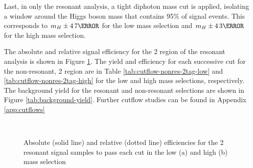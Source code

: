 Last, in only the resonant analysis, a tight diphoton mass cut is applied, isolating a window around the Higgs boson mass that contains 95\% of signal events. This corresponds to $m_H \pm \unit{4.7}{\GeV}$ for the low mass selection and $m_H \pm \unit{4.3}{\GeV}$ for the high mass selection.

The absolute and relative signal efficiency for the 2 \btag region of the resonant analysis is shown in Figure \ref{fig:resonant-cutflow}. The yield and efficiency for each successive cut for the non-resonant, 2 \btag region are in Table \ref{tab:cutflow-nonres-2tag-low} and \ref{tab:cutflow-nonres-2tag-high} for the low and high mass selections, respectively. The background yield for the resonant and non-resonant selections are shown in Figure \ref{tab:background-yield}. Further cutflow studies can be found in Appendix \ref{app:cutflows}

\begin{figure}[!h]
  \centering
  \\
  \caption[Absolute and relative efficiencies for the 2 \btag category, high mass selection]{Absolute (solid line) and relative (dotted line) efficiencies for the 2 \btag resonant signal samples to pass each cut in the low (a) and high (b) mass selection}
  \label{fig:resonant-cutflow}
\end{figure}

